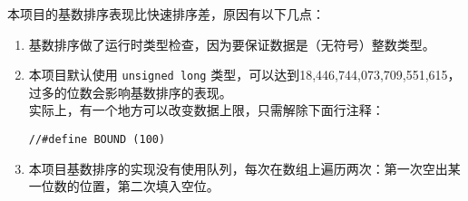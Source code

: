 本项目的基数排序表现比快速排序差，原因有以下几点：

\begin{enumerate}
    \item 基数排序做了运行时类型检查，因为要保证数据是（无符号）整数类型。
    \item 本项目默认使用 \lstinline{unsigned long} 类型，可以达到18,446,744,073,709,551,615，过多的位数会影响基数排序的表现。\\
    实际上，有一个地方可以改变数据上限，只需解除下面行注释：
\begin{lstlisting}[firstnumber=6, caption=规定数据上限]
    //#define BOUND (100)
\end{lstlisting}
    \item 本项目基数排序的实现没有使用队列，每次在数组上遍历两次：第一次空出某一位数的位置，第二次填入空位。
\end{enumerate}